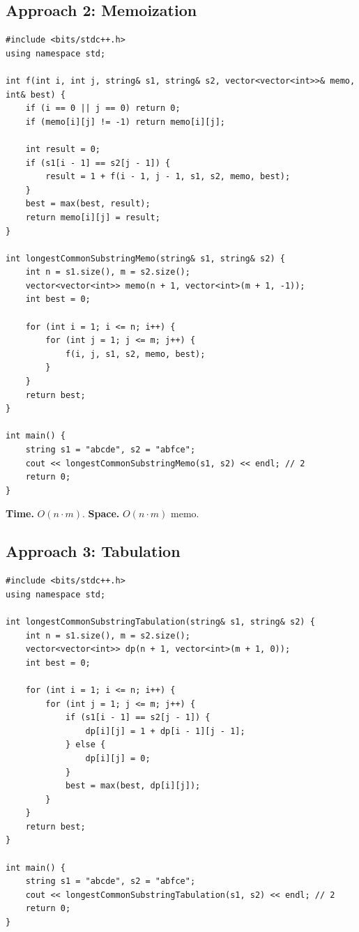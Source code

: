 \subsection*{Approach 2: Memoization}

\begin{lstlisting}
#include <bits/stdc++.h>
using namespace std;

int f(int i, int j, string& s1, string& s2, vector<vector<int>>& memo, int& best) {
    if (i == 0 || j == 0) return 0;
    if (memo[i][j] != -1) return memo[i][j];

    int result = 0;
    if (s1[i - 1] == s2[j - 1]) {
        result = 1 + f(i - 1, j - 1, s1, s2, memo, best);
    }
    best = max(best, result);
    return memo[i][j] = result;
}

int longestCommonSubstringMemo(string& s1, string& s2) {
    int n = s1.size(), m = s2.size();
    vector<vector<int>> memo(n + 1, vector<int>(m + 1, -1));
    int best = 0;

    for (int i = 1; i <= n; i++) {
        for (int j = 1; j <= m; j++) {
            f(i, j, s1, s2, memo, best);
        }
    }
    return best;
}

int main() {
    string s1 = "abcde", s2 = "abfce";
    cout << longestCommonSubstringMemo(s1, s2) << endl; // 2
    return 0;
}
\end{lstlisting}

\begin{complexitybox}
\textbf{Time.} $O(n \cdot m)$.
\textbf{Space.} $O(n \cdot m)$ memo.
\end{complexitybox}

\subsection*{Approach 3: Tabulation}

\begin{lstlisting}
#include <bits/stdc++.h>
using namespace std;

int longestCommonSubstringTabulation(string& s1, string& s2) {
    int n = s1.size(), m = s2.size();
    vector<vector<int>> dp(n + 1, vector<int>(m + 1, 0));
    int best = 0;

    for (int i = 1; i <= n; i++) {
        for (int j = 1; j <= m; j++) {
            if (s1[i - 1] == s2[j - 1]) {
                dp[i][j] = 1 + dp[i - 1][j - 1];
            } else {
                dp[i][j] = 0;
            }
            best = max(best, dp[i][j]);
        }
    }
    return best;
}

int main() {
    string s1 = "abcde", s2 = "abfce";
    cout << longestCommonSubstringTabulation(s1, s2) << endl; // 2
    return 0;
}
\end{lstlisting}

